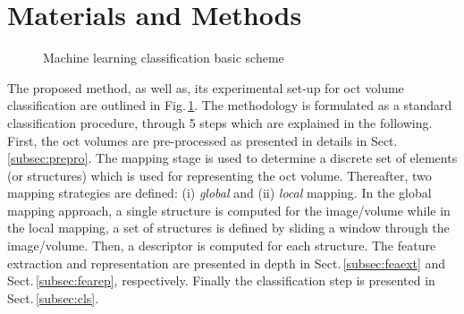 \graphicspath{ {./content/method/figures/}}

\section{Materials and Methods}\label{sec:method}

\begin{figure}[t]
  \caption{Machine learning classification basic scheme}
  \label{fig:ML-scheme}
\end{figure}


The proposed method, as well as, its experimental set-up for \ac{oct} volume classification are outlined in Fig.\,\ref{fig:ML-scheme}.
The methodology is formulated as a standard classification procedure, through 5 steps which are explained in the following.
First, the \ac{oct} volumes are pre-processed as presented in details in Sect.\,\ref{subsec:prepro}.
The mapping stage is used to determine a discrete set of elements (or structures) which is used for representing the \ac{oct} volume.
Thereafter, two mapping strategies are defined: (i) \emph{global} and (ii) \emph{local} mapping.
In the global mapping approach, a single structure is computed for the image/volume while in the local mapping, a set of structures is defined by sliding a window through the image/volume.
Then, a descriptor is computed for each structure.
The feature extraction and representation are presented in depth in Sect.\,\ref{subsec:feaext} and Sect.\,\ref{subsec:fearep}, respectively.
Finally the classification step is presented in Sect.\,\ref{subsec:cls}.

